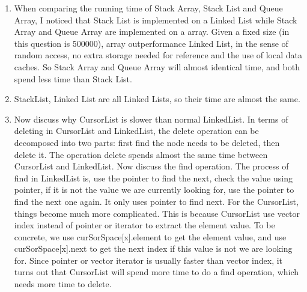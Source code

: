 \documentclass[]{article}
\begin{document}
\begin{enumerate}
\def\labelenumi{\arabic{enumi}.}
\item
  When comparing the running time of Stack Array, Stack List and Queue
  Array, I noticed that Stack List is implemented on a Linked List while
  Stack Array and Queue Array are implemented on a array. Given a fixed
  size (in this question is 500000), array outperformance Linked List,
  in the sense of random access, no extra storage needed for reference
  and the use of local data caches. So Stack Array and Queue Array will
  almost identical time, and both spend less time than Stack List.
\item
  StackList, Linked List are all Linked Lists, so their time are almost
  the same.
\item
  Now discuss why CursorList is slower than normal LinkedList. In terms
  of deleting in CursorList and LinkedList, the delete operation can be
  decomposed into two parts: first find the node needs to be deleted,
  then delete it. The operation delete spends almost the same time
  between CursorList and LinkedList. Now discuss the find operation. The
  process of find in LinkedList is, use the pointer to find the next,
  check the value using pointer, if it is not the value we are currently
  looking for, use the pointer to find the next one again. It only uses
  pointer to find next. For the CursorList, things become much more
  complicated. This is because CursorList use vector index instead of
  pointer or iterator to extract the element value. To be concrete, we
  use curSorSpace{[}x{]}.element to get the element value, and use
  curSorSpace{[}x{]}.next to get the next index if this value is not we
  are looking for. Since pointer or vector iterator is usually faster
  than vector index, it turns out that CursorList will spend more time
  to do a find operation, which needs more time to delete.
\end{enumerate}
\end{document}
